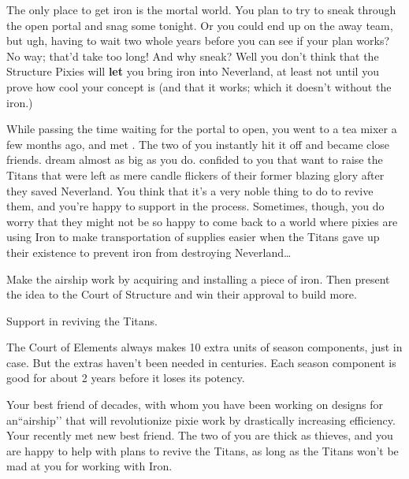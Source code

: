 \documentclass[char]{PP}
\begin{document}
The only place to get iron is the mortal world. You plan to try to sneak through the open portal and snag some tonight. Or you could end up on the away team, but ugh, having to wait two whole years before you can see if your plan works? No way; that'd take too long! And why sneak? Well you don't think that the Structure Pixies will \textbf{let} you bring iron into Neverland, at least not until you prove how cool your concept is (and that it works; which it doesn't without the iron.)

While passing the time waiting for the portal to open, you went to a tea mixer a few months ago, and met \cFTitan{}. The two of you instantly hit it off and became close friends. \cFTitan{\They} dream\cFTitan{\plural} almost as big as you do. \cFTitan{} confided to you that \cFTitan{\they} want\cFTitan{\plural} to raise the Titans that were left as mere candle flickers of their former blazing glory after they saved Neverland. You think that it's a very noble thing to do to revive them, and you're happy to support \cFTitan{} in the process. Sometimes, though, you do worry that they might not be so happy to come back to a world where pixies are using Iron to make transportation of supplies easier when the Titans gave up their existence to prevent iron from destroying Neverland\ldots


\begin{itemz}
	\item Make the airship work by acquiring and installing a piece of iron. Then present the idea to the Court of Structure and win their approval to build more.
	\item Support \cFTitan{} in reviving the Titans.
\end{itemz}

\begin{itemz}[Notes]
	\item The Court of Elements always makes 10 extra units of season components, just in case. But the extras haven't been needed in centuries. Each season component is good for about 2 years before it loses its potency.
\end{itemz}

\begin{contacts}
	\contact{\cMAirship{}} Your best friend of decades, with whom you have been working on designs for an``airship'’ that will revolutionize pixie work by drastically increasing efficiency.
	\contact{\cFTitan{}} Your recently met new best friend. The two of you are thick as thieves, and you are happy to help \cFTitan{\them} with \cFTitan{\their} plans to revive the Titans, as long as the Titans won't be mad at you for working with Iron.
\end{contacts}
\end{document}
